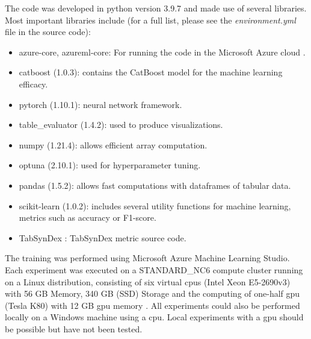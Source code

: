 The code was developed in python version 3.9.7 and made use of several libraries.
Most important libraries include (for a full list, please see the \textit{environment.yml} file in the source code):
\begin{itemize}
	\item azure-core, azureml-core: For running the code in the Microsoft Azure cloud \cite{microsoft2023CloudComputingServices}.
	\item catboost (1.0.3): contains the CatBoost model for the machine learning efficacy.
	\item pytorch (1.10.1): neural network framework.
	\item table\_evaluator (1.4.2): used to produce visualizations.
	\item numpy (1.21.4): allows efficient array computation.
	\item optuna (2.10.1): used for hyperparameter tuning.
	\item pandas (1.5.2): allows fast computations with dataframes of tabular data.
	\item scikit-learn (1.0.2): includes several utility functions for machine learning, \eg metrics such as accuracy or F1-score.
	\item TabSynDex \cite{chundawat2022UniversalMetricRobusta}: TabSynDex metric source code.
\end{itemize}

The training was performed using Microsoft Azure Machine Learning Studio.
Each experiment was executed on a STANDARD\_NC6 compute cluster running on a Linux distribution, consisting of six virtual \glspl{cpu} (Intel Xeon E5-2690v3) with 56 GB Memory, 340 GB (SSD) Storage and the computing of one-half \gls{gpu} (Tesla K80) with 12 GB \gls{gpu} memory \cite{vikancha-msft2022NCseriesAzureVirtual}.
All experiments could also be performed locally on a Windows machine using a \gls{cpu}.
Local experiments with a \gls{gpu} should be possible but have not been tested.

